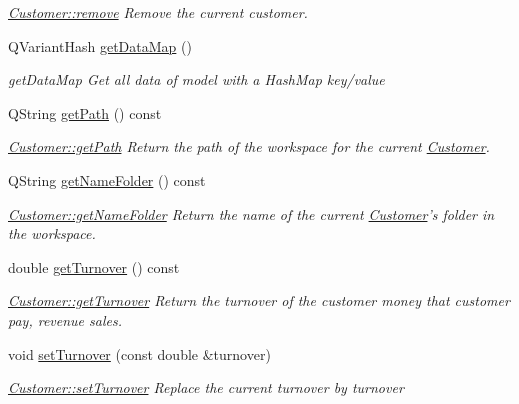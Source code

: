 \begin{DoxyCompactItemize}
\begin{DoxyCompactList}\small\item\em \hyperlink{classModels_1_1Customer_a0f5dba0d90af0adf5d0aca26195d21b1}{Customer\-::remove} Remove the current customer. \end{DoxyCompactList}\item 
Q\-Variant\-Hash \hyperlink{classModels_1_1Customer_ae72b05319056dc482f3f525ef40b8d40}{get\-Data\-Map} ()
\begin{DoxyCompactList}\small\item\em get\-Data\-Map Get all data of model with a Hash\-Map key/value \end{DoxyCompactList}\item 
Q\-String \hyperlink{classModels_1_1Customer_ac1aec0fb9058333e1a2496b1c29049af}{get\-Path} () const 
\begin{DoxyCompactList}\small\item\em \hyperlink{classModels_1_1Customer_ac1aec0fb9058333e1a2496b1c29049af}{Customer\-::get\-Path} Return the path of the workspace for the current \hyperlink{classModels_1_1Customer}{Customer}. \end{DoxyCompactList}\item 
Q\-String \hyperlink{classModels_1_1Customer_ab7c63946125a6b8d876f0f4e2b50c97e}{get\-Name\-Folder} () const 
\begin{DoxyCompactList}\small\item\em \hyperlink{classModels_1_1Customer_ab7c63946125a6b8d876f0f4e2b50c97e}{Customer\-::get\-Name\-Folder} Return the name of the current \hyperlink{classModels_1_1Customer}{Customer}'s folder in the workspace. \end{DoxyCompactList}\item 
double \hyperlink{classModels_1_1Customer_a193fb1920b53048d8a5f7c8e08581e69}{get\-Turnover} () const 
\begin{DoxyCompactList}\small\item\em \hyperlink{classModels_1_1Customer_a193fb1920b53048d8a5f7c8e08581e69}{Customer\-::get\-Turnover} Return the turnover of the customer money that customer pay, revenue sales. \end{DoxyCompactList}\item 
void \hyperlink{classModels_1_1Customer_aee29f27497db5cd37bc835e202c24eac}{set\-Turnover} (const double \&turnover)
\begin{DoxyCompactList}\small\item\em \hyperlink{classModels_1_1Customer_aee29f27497db5cd37bc835e202c24eac}{Customer\-::set\-Turnover} Replace the current turnover by {\itshape turnover} \end{DoxyCompactList}\item 

\end{DoxyCompactItemize}
